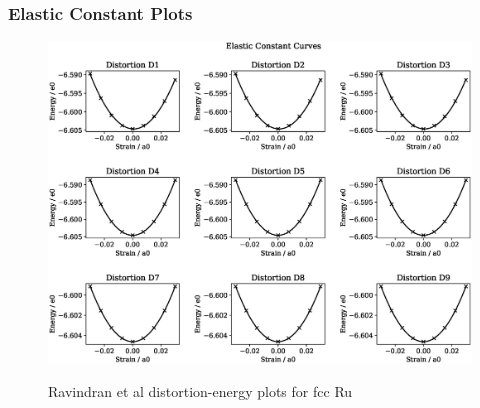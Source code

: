 \clearpage
\subsubsection{Elastic Constant Plots}

\begin{figure}[htb]
\centering
\includegraphics[width=.90\linewidth]{chapters/potentials_fe_pd_ru/feru_potential/ec_rfkj/elastic_strains_bp_2.eps}  
\label{fig:feru-fefcc-rose}
\caption{Ravindran et al\cite{dftrfkj} distortion-energy plots for \acrshort{fcc} Ru}
\end{figure}

